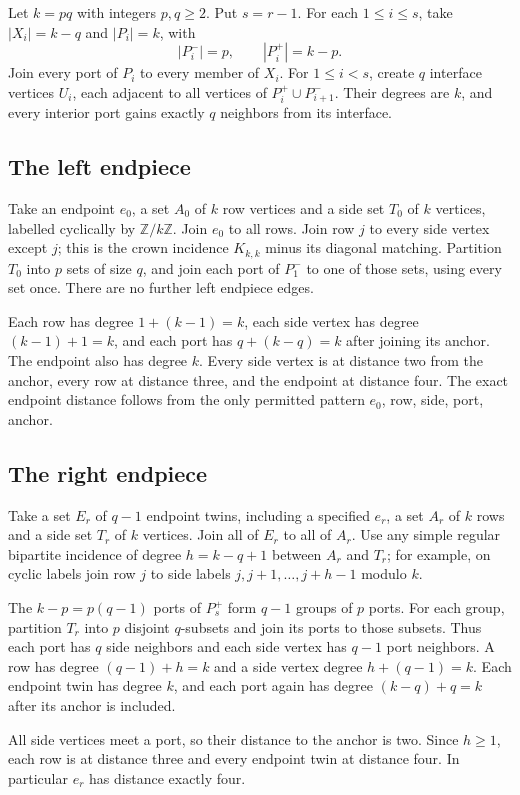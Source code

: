 \documentclass[11pt]{article}
\begin{document}
Let $k=pq$ with integers $p,q\geq2$. Put $s=r-1$. For each
$1\leq i\leq s$, take $|X_i|=k-q$ and $|P_i|=k$, with
\[
 |P_i^-|=p,\qquad |P_i^+|=k-p.
\]
Join every port of $P_i$ to every member of $X_i$. For $1\leq i<s$,
create $q$ interface vertices $U_i$, each adjacent to all vertices
of $P_i^+\cup P_{i+1}^-$. Their degrees are $k$, and every interior
port gains exactly $q$ neighbors from its interface.

\subsection*{The left endpiece}
Take an endpoint $e_0$, a set $A_0$ of $k$ row vertices and a side set
$T_0$ of $k$ vertices, labelled cyclically by $\mathbb Z/k\mathbb Z$.
Join $e_0$ to all rows. Join row $j$ to every side vertex except $j$;
this is the crown incidence $K_{k,k}$ minus its diagonal matching.
Partition $T_0$ into $p$ sets of size $q$, and join each port of
$P_1^-$ to one of those sets, using every set once. There are no
further left endpiece edges.

Each row has degree $1+(k-1)=k$, each side vertex has degree
$(k-1)+1=k$, and each port has $q+(k-q)=k$ after joining its anchor.
The endpoint also has degree $k$. Every side vertex is at distance
two from the anchor, every row at distance three, and the endpoint
at distance four. The exact endpoint distance follows from the only
permitted pattern $e_0$, row, side, port, anchor.

\subsection*{The right endpiece}
Take a set $E_r$ of $q-1$ endpoint twins, including a specified
$e_r$, a set $A_r$ of $k$ rows and a side set $T_r$ of $k$ vertices.
Join all of $E_r$ to all of $A_r$. Use any simple regular bipartite
incidence of degree $h=k-q+1$ between $A_r$ and $T_r$; for example,
on cyclic labels join row $j$ to side labels
$j,j+1,\ldots,j+h-1$ modulo $k$.

The $k-p=p(q-1)$ ports of $P_s^+$ form $q-1$ groups of $p$ ports.
For each group, partition $T_r$ into $p$ disjoint $q$-subsets and
join its ports to those subsets. Thus each port has $q$ side
neighbors and each side vertex has $q-1$ port neighbors. A row has
degree $(q-1)+h=k$ and a side vertex degree $h+(q-1)=k$.
Each endpoint twin has degree $k$, and each port again has degree
$(k-q)+q=k$ after its anchor is included.

All side vertices meet a port, so their distance to the anchor is
two. Since $h\geq1$, each row is at distance three and every endpoint
twin at distance four. In particular $e_r$ has distance exactly four.
\end{document}

